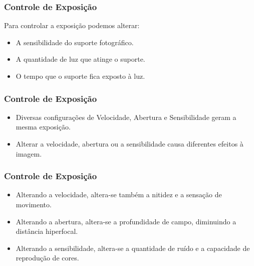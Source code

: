 
\begin{frame}
    \frametitle{Controle de Exposição}
    Para controlar a exposição podemos alterar:
    \begin{itemize}
        \item A sensibilidade do suporte fotográfico.
        \item A quantidade de luz que atinge o suporte.
        \item O tempo que o suporte fica exposto à luz.
    \end{itemize}
\end{frame}


\begin{frame}
    \frametitle{Controle de Exposição}
    \begin{itemize}
        \item Diversas configurações de Velocidade, Abertura e Sensibilidade geram a mesma exposição.
        \item Alterar a velocidade, abertura ou a sensibilidade causa diferentes efeitos à imagem.
    \end{itemize}
\end{frame}

\begin{frame}
    \frametitle{Controle de Exposição}
    \begin{itemize}
        \item Alterando a velocidade, altera-se também a nitidez e a sensação de movimento.
        \item Alterando a abertura, altera-se a profundidade de campo, diminuindo a distância hiperfocal.
        \item Alterando a sensibilidade, altera-se a quantidade de ruído e a capacidade de reprodução de cores.
    \end{itemize}
\end{frame}






